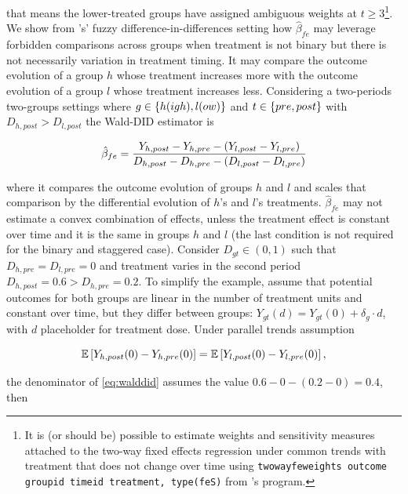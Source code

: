 \documentclass[11pt]{article}
\begin{document}
that means the lower-treated groups have assigned ambiguous weights at $t \geq 3$\footnote{It is (or should be) possible to estimate weights and sensitivity measures attached to the two-way fixed effects regression under common trends with treatment that does not change over time using \texttt{twowayfeweights outcome groupid timeid treatment, type(feS)} from \citet{bib:dechaisemartin2019a}'s program.}. We show from \citet{bib:dechaisemartin2018}'s' fuzzy difference-in-differences setting how $\hat{\beta}_{fe}$ may leverage forbidden comparisons across groups when treatment is not binary but there is not necessarily variation in treatment timing. It may compare the outcome evolution of a group $h$ whose treatment increases more with the outcome evolution of a group $l$ whose treatment increases less. Considering a two-periods two-groups settings where $g \in \left\{  h(igh), l(ow) \right\}$ and $t \in \left\{  pre, post \right\}$ with $D_{h,post} > D_{l,post}$ the Wald-DID estimator is

\begin{equation}
    \hat{\beta}_{fe} = \frac{Y_{h,post} - Y_{h,pre} - \left( Y_{l,post} - Y_{l,pre} \right)}{D_{h,post} - D_{h,pre} - \left( D_{l,post} - D_{l,pre} \right)}\label{eq:walddid}
\end{equation}

where it compares the outcome evolution of groups $h$ and $l$ and scales that comparison by the differential evolution of $h$'s and $l$'s treatments. $\hat{\beta}_{fe}$ may not estimate a convex combination of effects, unless the treatment effect is constant over time and it is the same in groups $h$ and $l$ (the last condition is not required for the binary and staggered case). Consider $D_{gt} \in (0, 1)$ such that $D_{h,pre} = D_{l,pre} = 0$ and treatment varies in the second period $D_{h,post} = 0.6 > D_{h,pre} = 0.2$. To simplify the example, assume that potential outcomes for both groups are linear in the number of treatment units and constant over time, but they differ between groups: $Y_{gt}(d) = Y_{gt}(0) + \delta_{g} \cdot d$, with $d$ placeholder for treatment dose. Under parallel trends assumption

\begin{equation*}
    \mathbb{E} \left[ Y_{h,post}(0) - Y_{h,pre}(0) \right] = \mathbb{E} \left[ Y_{l,post}(0) - Y_{l,pre}(0) \right],
\end{equation*}

the denominator of \eqref{eq:walddid} assumes the value $0.6 - 0 - (0.2 - 0) = 0.4$, then
\end{document}
